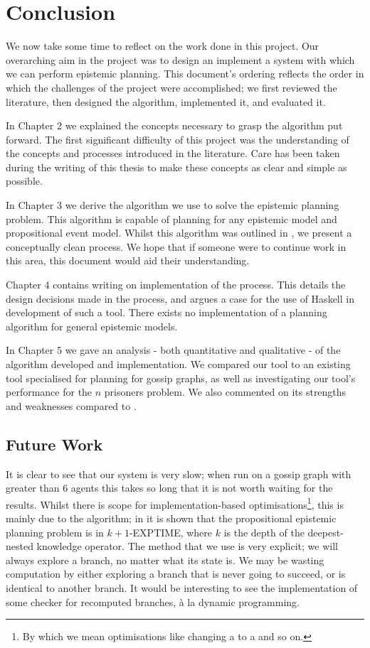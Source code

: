 \documentclass[ %
                    author={Leo Poulson},
                supervisor={Dr. Steven Ramsay},
                    degree={BSc},
                     title={Epistemic Planning for the Dynamic Gossip problem},
                  subtitle={},
                      year={2019} ]{dissertation}
\begin{document}
\newpage

\chapter{Conclusion}

We now take some time to reflect on the work done in this project. Our
overarching aim in the project was to design an implement a system with which we
can perform epistemic planning. This document's ordering reflects the order in
which the challenges of the project were accomplished; we first reviewed the
literature, then designed the algorithm, implemented it, and evaluated it. 

In Chapter 2 we explained the concepts necessary to grasp the algorithm put
forward. The first significant difficulty of this project was the understanding
of the concepts and processes introduced in the literature. Care has been taken
during the writing of this thesis to make these concepts as clear and simple as
possible. 

In Chapter 3 we derive the algorithm we use to solve the epistemic planning
problem. This algorithm is capable of planning for any epistemic model and
propositional event model. Whilst this algorithm was outlined in
\cite{AutomataTechniques}, we present a conceptually clean process. We hope that
if someone were to continue work in this area, this document would aid their
understanding.

Chapter 4 contains writing on implementation of the process. This details the
design decisions made in the process, and argues a case for the use of Haskell
in development of such a tool. There exists no implementation of a planning
algorithm for general epistemic models. 

In Chapter 5 we gave an analysis - both quantitative and qualitative - of the
algorithm developed and implementation. We compared our tool to an existing tool
specialised for planning for gossip graphs, as well as investigating our tool's
performance for the $n$ prisoners problem. We also commented on its strengths and
weaknesses compared to \cite{GithubGossip}.

\section{Future Work}

It is clear to see that our system is very slow; when run on a gossip graph with
greater than 6 agents this takes so long that it is not worth waiting for the
results. Whilst there is scope for implementation-based
optimisations\footnote{By which we mean optimisations like changing a 
  to a  and so on.}, this is mainly due to the algorithm; in
\cite{AutomataTechniques} it is shown that the propositional epistemic planning
problem is in \textsf{$k + 1$-EXPTIME}, where $k$ is the depth of the
deepest-nested knowledge operator. The method that we use is very explicit; we
will always explore a branch, no matter what its state is. We may be wasting
computation by either exploring a branch that is never going to succeed, or is
identical to another branch. It would be interesting to see the implementation
of some checker for recomputed branches, \`{a} la dynamic programming.
\end{document}
